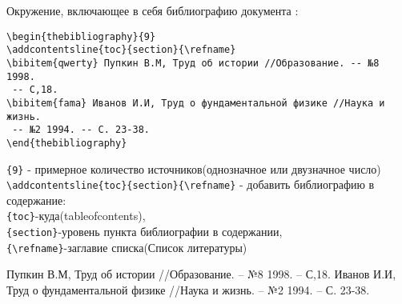\documentclass[a4paper,12pt]{article}%
\theoremstyle{plain}%
\theoremstyle{definition}%
\theoremstyle{remark}%
\begin{document}
Окружение, включающее в себя библиографию документа : \\
\begin{verbatim}
\begin{thebibliography}{9}
\addcontentsline{toc}{section}{\refname}
\bibitem{qwerty} Пупкин В.М, Труд об истории //Образование. -- №8 1998.
 -- С,18.
\bibitem{fama} Иванов И.И, Труд о фундаментальной физике //Наука и жизнь.
 -- №2 1994. -- С. 23-38.
\end{thebibliography}
\end{verbatim}
\verb|{9}| - примерное количество источников(однозначное или двузначное число) \\
\verb|\addcontentsline{toc}{section}{\refname}| - добавить библиографию в содержание: \\
\verb|{toc}|-куда(tableofcontents), \\ \verb|{section}|-уровень пункта библиографии в содержании, \\
\verb|{\refname}|-заглавие списка(Список литературы) \\
\begin{thebibliography}{9}
 Пупкин В.М, Труд об истории //Образование. -- №8 1998. -- С,18.
 Иванов И.И, Труд о фундаментальной физике //Наука и жизнь. -- №2 1994. -- С. 23-38.
\end{thebibliography}











\tableofcontents%

\end{document}
